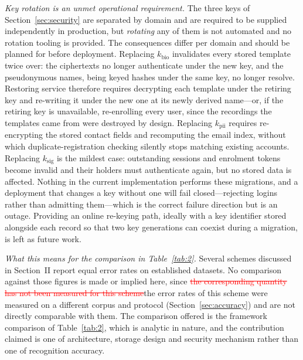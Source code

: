\documentclass[10pt,journal,compsoc]{IEEEtran}
\begin{document}
{\emph{Key rotation is an unmet operational requirement.} The three keys of Section~\ref{sec:security} are separated by domain and are required to be supplied independently in production, but \emph{rotating} any of them is not automated and no rotation tooling is provided. The consequences differ per domain and should be planned for before deployment. Replacing $k_{\text{bio}}$ invalidates every stored template twice over: the ciphertexts no longer authenticate under the new key, and the pseudonymous names, being keyed hashes under the same key, no longer resolve. Restoring service therefore requires decrypting each template under the retiring key and re-writing it under the new one at its newly derived name---or, if the retiring key is unavailable, re-enrolling every user, since the recordings the templates came from were destroyed by design. Replacing $k_{\text{pii}}$ requires re-encrypting the stored contact fields and recomputing the email index, without which duplicate-registration checking silently stops matching existing accounts. Replacing $k_{\text{sig}}$ is the mildest case: outstanding sessions and enrolment tokens become invalid and their holders must authenticate again, but no stored data is affected. Nothing in the current implementation performs these migrations, and a deployment that changes a key without one will fail closed---rejecting logins rather than admitting them---which is the correct failure direction but is an outage. Providing an online re-keying path, ideally with a key identifier stored alongside each record so that two key generations can coexist during a migration, is left as future work.

\emph{What this means for the comparison in Table~\ref{tab:2}.} Several schemes discussed in Section~II report equal error rates on established datasets. No comparison against those figures is made or implied here, since \textcolor{red}{\sout{the corresponding quantity has not been measured for this scheme}}\textcolor{revpink}{the error rates of this scheme were measured on a different corpus and protocol (Section~\ref{sec:accuracy}) and are not directly comparable with them}. The comparison offered is the framework comparison of Table~\ref{tab:2}, which is analytic in nature, and the contribution claimed is one of architecture, storage design and security mechanism rather than one of recognition accuracy.
}
\end{document}
